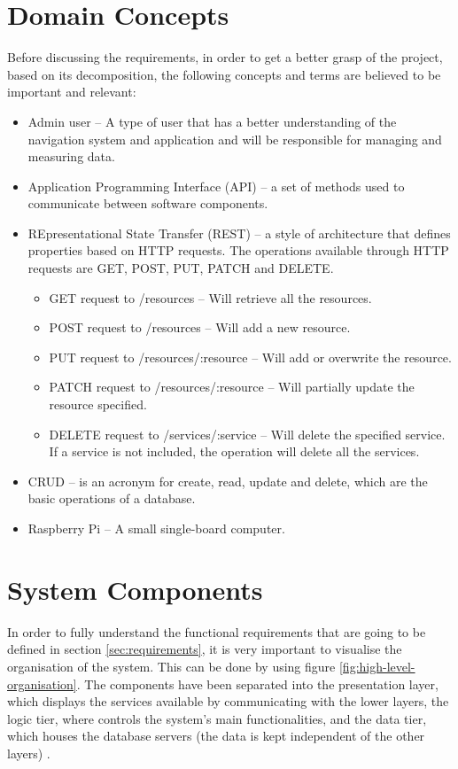 \section{Domain Concepts}
\label{sec:domain-concepts}
Before discussing the requirements, in order to get a better grasp of the project, based on its decomposition, the following concepts and terms are believed to be important and relevant:
\begin{itemize}
    \item Admin user – A type of user that has a better understanding of the navigation system and application and will be responsible for managing and measuring data.
    \item Application Programming Interface (API) – a set of methods used to communicate between software components.
    \item REpresentational State Transfer (REST) – a style of architecture that defines properties based on HTTP requests. The operations available through HTTP requests are GET, POST, PUT, PATCH and DELETE.
        \begin{itemize}
            \item GET request to /resources – Will retrieve all the resources.
            \item POST request to /resources – Will add a new resource.
            \item PUT request to /resources/:resource – Will add or overwrite the resource.
            \item PATCH request to /resources/:resource – Will partially update the resource specified.
            \item DELETE request to /services/:service – Will delete the specified service. If a service is not included, the operation will delete all the services.
        \end{itemize}
    \item CRUD – is an acronym for create, read, update and delete, which are the basic operations of a database.
    \item Raspberry Pi – A small single-board computer.
\end{itemize}
\newpage

\section{System Components}
In order to fully understand the functional requirements that are going to be defined in section \ref{sec:requirements}, it is very important to visualise the organisation of the system. This can be done by using figure \ref{fig:high-level-organisation}. The components have been separated into the presentation layer, which displays the services available by communicating with the lower layers, the logic tier, where controls the system's main functionalities, and the data tier, which houses the database servers (the data is kept independent of the other layers) \cite{three-tier}.

